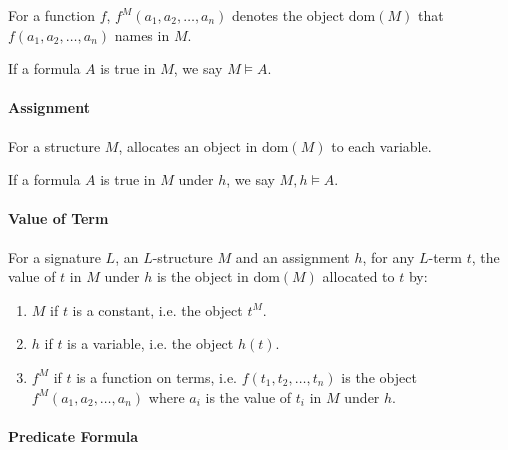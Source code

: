 \documentclass[10pt,twoside,twocolumn]{article}
\begin{document}
For a function $f$, $f^{M}\left(a_{1},a_{2},\dots,a_{n}\right)$
denotes the object $\mbox{dom}\left(M\right)$ that $f\left(a_{1},a_{2},\dots,a_{n}\right)$
names in $M$.

If a formula $A$ is true in $M$, we say $M\vDash A$.


\paragraph{Assignment}

For a structure $M$, allocates an object in $\mbox{dom}\left(M\right)$
to each variable.

If a formula $A$ is true in $M$ under $h$, we say $M,h\vDash A$.


\paragraph{Value of Term}

For a signature $L$, an $L$-structure $M$ and an assignment $h$,
for any $L$-term $t$, the value of $t$ in $M$ under $h$ is the
object in $\mbox{dom}\left(M\right)$ allocated to $t$ by:
\begin{enumerate}
\item $M$ if $t$ is a constant, i.e. the object $t^{M}$.
\item $h$ if $t$ is a variable, i.e. the object $h\left(t\right)$.
\item $f^{M}$ if $t$ is a function on terms, i.e. $f\left(t_{1},t_{2},\dots,t_{n}\right)$
is the object $f^{M}\left(a_{1},a_{2},\dots,a_{n}\right)$ where $a_{i}$
is the value of $t_{i}$ in $M$ under $h$.
\end{enumerate}

\paragraph{Predicate Formula}
\end{document}
